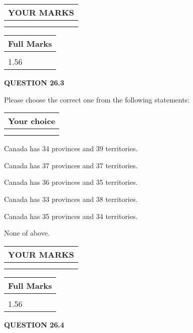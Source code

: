 \documentclass[12pt]{article}
\begin{document}
 
\vspace{0.3in}
  
\vspace{0.2in}
  
\noindent\begin{tabular}{|l|}
\hline
 YOUR MARKS  \\
\hline
 \\ 
 \\ 
\hline
\end{tabular}
\hspace{0.05in} \begin{tabular}{|l|}
\hline
 Full Marks  \\
\hline
 \\ 
1.56 \\
\hline
\end{tabular}
{\textbf{\Large{QUESTION
26.3 
}}}
  
  
Please choose the correct one from the following statements:
  
  
\noindent\hspace{3.0in} \begin{tabular}{|l|}
\hline
Your choice \\
\hline
 \\ 
 \\ 
\hline
\end{tabular}
  
  
 
 
Canada has  %
34 provinces and  %
39 territories.
 
 
Canada has  %
37 provinces and  %
37 territories.
 
 
Canada has  %
36 provinces and  %
35 territories.
 
 
Canada has  %
33 provinces and  %
38 territories.
 
 
Canada has  %
35 provinces and  %
34 territories.
 
 
 None of above.
 
 
  
\vspace{0.2in}
  
\noindent\begin{tabular}{|l|}
\hline
 YOUR MARKS  \\
\hline
 \\ 
 \\ 
\hline
\end{tabular}
\hspace{0.05in} \begin{tabular}{|l|}
\hline
 Full Marks  \\
\hline
 \\ 
1.56 \\
\hline
\end{tabular}
{\textbf{\Large{QUESTION
26.4 
}}}
  
\end{document}
